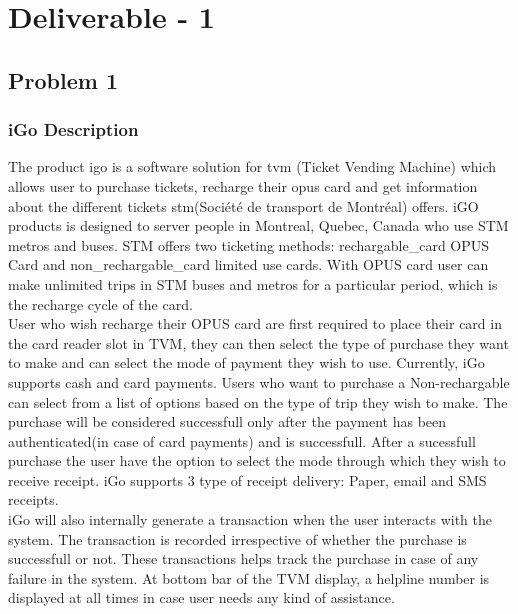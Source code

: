 \documentclass[a4paper,12pt]{report}
\begin{document}

\newpage

\tableofcontents




\chapter*{\centering Deliverable - 1}

\section{Problem 1}

\subsection{iGo Description}
The product \gls{igo} is a software solution for \gls{tvm} (Ticket Vending Machine) which allows user to purchase tickets, recharge their \gls{opus} card and get information about the different tickets \gls{stm}(Société de transport de Montréal) offers. iGO products is designed to server people in Montreal, Quebec, Canada who use STM metros and buses. STM offers two ticketing methods: \gls{rechargable_card} OPUS Card and \gls{non_rechargable_card} limited use cards. With OPUS card user can make unlimited trips in STM buses and metros for a particular period, which is the recharge cycle of the card. \\


User who wish recharge their OPUS card are first required to place their card in the card reader slot in TVM, they can then select the type of purchase they want to make and can select the mode of payment they wish to use. Currently, iGo supports cash and card payments. Users who want to purchase a Non-rechargable can select from a list of options based on the type of trip they wish to make. The purchase will be considered successfull only after the payment has been authenticated(in case of card payments) and is successfull. After a sucessfull purchase the user have the option to select the mode through which they wish to receive receipt. iGo supports 3 type of receipt delivery: Paper, email and SMS receipts. \\

iGo will also internally generate a transaction when the user interacts with the system. The transaction is recorded irrespective of whether the purchase is successfull or not. These transactions helps track the purchase in case of any failure in the system. At bottom bar of the TVM display, a helpline number is displayed at all times in case user needs any kind of assistance.
\end{document}
